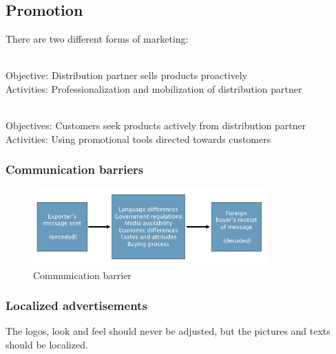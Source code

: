 \subsection{Promotion}

There are two different forms of marketing:

\begin{description}
	\tightlist
	\item[Push marketing] \mbox{}\\
	Objective: Distribution partner sells products proactively\\
	Activities: Professionalization and mobilization of distribution partner
	\item[Pull marketing] \mbox{}\\
	Objectives: Customers seek products actively from distribution partner\\
	Activities: Using promotional tools directed towards customers
\end{description}

\subsubsection{Communication barriers}
\begin{figure}[H]
	\centering
	\includegraphics[width=0.8\textwidth]{figures/communicationBarriers.png}
	\caption{Communication barrier}
\end{figure}

\subsubsection{Localized advertisements}
The logos, look and feel should never be adjusted, but the pictures and texts should be localized.
